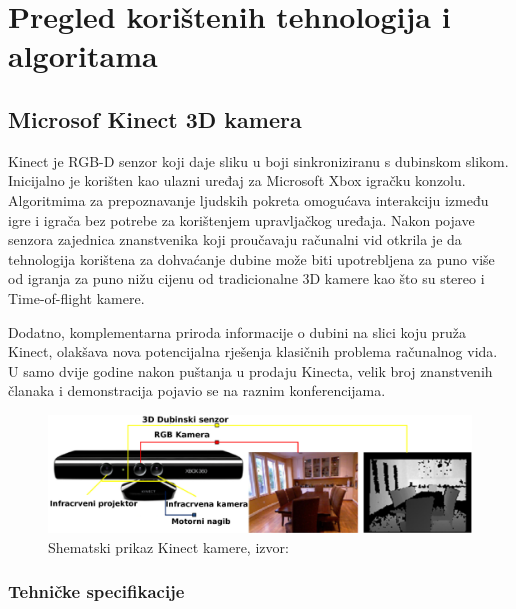 \newpage
\setcounter{figure}{0}

\section{Pregled korištenih tehnologija i algoritama} %
\label{sec:Tehnologija i teorija}

\subsection{Microsof Kinect 3D kamera} %
\label{sub:Microsof Kinect 3D kamera}

Kinect je RGB-D senzor koji daje sliku u boji sinkroniziranu s dubinskom
slikom. Inicijalno je korišten kao ulazni uređaj za Microsoft Xbox
igračku konzolu. Algoritmima za prepoznavanje ljudskih pokreta omogućava
interakciju između igre i igrača bez potrebe za korištenjem upravljačkog
uređaja.  Nakon pojave senzora zajednica znanstvenika koji proučavaju
računalni vid otkrila je da tehnologija korištena za dohvaćanje dubine
može biti upotrebljena za puno više od igranja za puno nižu cijenu od
tradicionalne 3D kamere kao što su stereo i Time-of-flight kamere.

Dodatno, komplementarna priroda informacije o dubini na slici koju pruža
Kinect, olakšava nova potencijalna rješenja klasičnih problema računalnog
vida. U samo dvije godine nakon puštanja u prodaju Kinecta, velik broj
znanstvenih članaka i demonstracija pojavio se na raznim konferencijama.

\begin{figure}[h]
\centering
\includegraphics[scale=0.15]{figures/kinect.png}
\caption{Shematski prikaz Kinect kamere, izvor:~\cite{HanSXS13}}
\label{fig:kinect.png}
\end{figure}

\subsubsection{Tehničke specifikacije} %
\label{ssub:Tehničke specifikacije}

